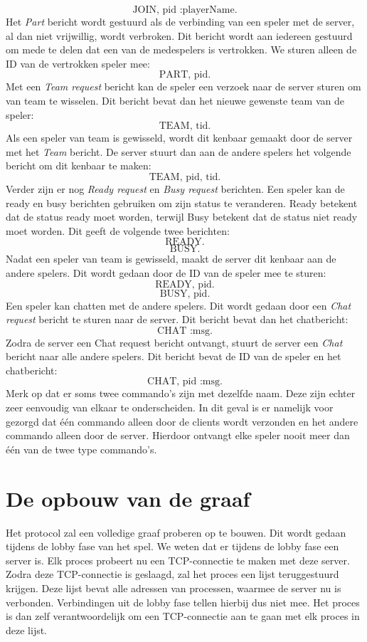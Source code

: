 \documentclass[a4paper,11pt]{article}
\begin{document}
    \[
    \text{JOIN, pid :playerName.}
    \]
    Het \emph{Part} bericht wordt gestuurd als de verbinding van een speler met de server, al dan niet vrijwillig, wordt verbroken. Dit bericht wordt aan iedereen gestuurd om mede te delen dat een van de medespelers is vertrokken. We sturen alleen de ID van de vertrokken speler mee:
    \[
    \text{PART, pid.}
    \]
    Met een \emph{Team request} bericht kan de speler een verzoek naar de server sturen om van team te wisselen. Dit bericht bevat dan het nieuwe gewenste team van de speler:
    \[
    \text{TEAM, tid.}
    \]
    Als een speler van team is gewisseld, wordt dit kenbaar gemaakt door de server met het \emph{Team} bericht. De server stuurt dan aan de andere spelers het volgende bericht om dit kenbaar te maken:
    \[
    \text{TEAM, pid, tid.}
    \]
    Verder zijn er nog \emph{Ready request} en \emph{Busy request} berichten. Een speler kan de ready en busy berichten gebruiken om zijn status te veranderen. Ready betekent dat de status ready moet worden, terwijl Busy betekent dat de status niet ready moet worden. Dit geeft de volgende twee berichten:
    \[
    \text{READY.}
    \]
    \[
    \text{BUSY.}
    \]
    Nadat een speler van team is gewisseld, maakt de server dit kenbaar aan de andere spelers. Dit wordt gedaan door de ID van de speler mee te sturen:
    \[
    \text{READY, pid.}
    \]
    \[
    \text{BUSY, pid.}
    \]
    Een speler kan chatten met de andere spelers. Dit wordt gedaan door een \emph{Chat request} bericht te sturen naar de server. Dit bericht bevat dan het chatbericht:
    \[
    \text{CHAT :msg.}
    \]
    Zodra de server een Chat request bericht ontvangt, stuurt de server een \emph{Chat} bericht naar alle andere spelers. Dit bericht bevat de ID van de speler en het chatbericht:
    \[
    \text{CHAT, pid :msg.}
    \]
    Merk op dat er soms twee commando's zijn met dezelfde naam. Deze zijn echter zeer eenvoudig van elkaar te onderscheiden. In dit geval is er namelijk voor gezorgd dat \'e\'en commando alleen door de clients wordt verzonden en het andere commando alleen door de server. Hierdoor ontvangt elke speler nooit meer dan \'e\'en van de twee type commando's.


    \section{De opbouw van de graaf}
    Het protocol zal een volledige graaf proberen op te bouwen. Dit wordt gedaan tijdens de lobby fase van het spel. We weten dat er tijdens de lobby fase een server is. Elk proces probeert nu een TCP-connectie te maken met deze server. Zodra deze TCP-connectie is geslaagd, zal het proces een lijst teruggestuurd krijgen. Deze lijst bevat alle adressen van processen, waarmee de server nu is verbonden. Verbindingen uit de lobby fase tellen hierbij dus niet mee. Het proces is dan zelf verantwoordelijk om een TCP-connectie aan te gaan met elk proces in deze lijst.
\end{document}
